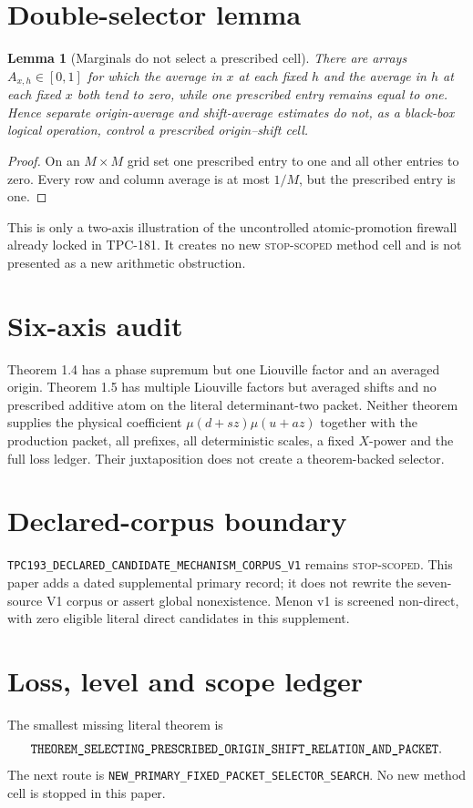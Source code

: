 \documentclass[11pt]{article}
\newtheorem{lemma}{Lemma}
\begin{document}
\section{Double-selector lemma}
\begin{lemma}[Marginals do not select a prescribed cell]
There are arrays \(A_{x,h}\in[0,1]\) for which the average in \(x\) at each
fixed \(h\) and the average in \(h\) at each fixed \(x\) both tend to zero,
while one prescribed entry remains equal to one.  Hence separate
origin-average and shift-average estimates do not, as a black-box logical
operation, control a prescribed origin--shift cell.
\end{lemma}
\begin{proof}
On an \(M\times M\) grid set one prescribed entry to one and all other
entries to zero.  Every row and column average is at most \(1/M\), but the
prescribed entry is one.
\end{proof}
This is only a two-axis illustration of the uncontrolled atomic-promotion
firewall already locked in TPC-181.  It creates no new
\textsc{stop-scoped} method cell and is not presented as a new arithmetic
obstruction.

\section{Six-axis audit}
Theorem 1.4 has a phase supremum but one Liouville factor and an averaged
origin.  Theorem 1.5 has multiple Liouville factors but averaged shifts and
no prescribed additive atom on the literal determinant-two packet.  Neither
theorem supplies the physical coefficient
\(\mu(d+sz)\mu(u+az)\) together with the production packet, all prefixes,
all deterministic scales, a fixed \(X\)-power and the full loss ledger.
Their juxtaposition does not create a theorem-backed selector.

\section{Declared-corpus boundary}
\texttt{TPC193\_DECLARED\_CANDIDATE\_MECHANISM\_CORPUS\_V1} remains
\textsc{stop-scoped}.  This paper adds a dated supplemental primary record;
it does not rewrite the seven-source V1 corpus or assert global
nonexistence.  Menon v1 is screened non-direct, with zero eligible literal
direct candidates in this supplement.


\section{Loss, level and scope ledger}
The smallest missing literal theorem is
\[
\texttt{THEOREM\_\allowbreak{}SELECTING\_\allowbreak{}PRESCRIBED\_\allowbreak{}ORIGIN\_\allowbreak{}SHIFT\_\allowbreak{}RELATION\_\allowbreak{}AND\_\allowbreak{}PACKET}.
\]
The next route is \texttt{NEW\_\allowbreak{}PRIMARY\_\allowbreak{}FIXED\_\allowbreak{}PACKET\_\allowbreak{}SELECTOR\_\allowbreak{}SEARCH}.
No new method cell is stopped in this paper.
\end{document}
